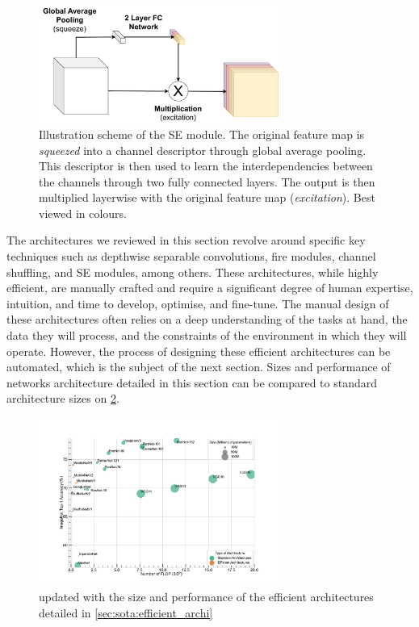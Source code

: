 
\begin{figure}[htbp]
    \centering
    \includegraphics[width=0.70\textwidth]{chapter_sota/assets/SE_module.pdf}
    \caption{Illustration scheme of the \acf{SE} module. The original feature
    map is \emph{squeezed} into a channel descriptor through global average
    pooling. This descriptor is then used to learn the interdependencies between
    the channels through two fully connected layers. The output is then
    multiplied layerwise with the original feature map (\emph{excitation}). Best
    viewed in colours.}
    \label{fig:sota:se_module}
\end{figure}


The architectures we reviewed in this section revolve around specific key
techniques such as depthwise separable convolutions, fire modules, channel
shuffling, and \ac{SE} modules, among others. These architectures, while highly
efficient, are manually crafted and require a significant degree of human
expertise, intuition, and time to develop, optimise, and fine-tune. The manual
design of these architectures often relies on a deep understanding of the tasks
at hand, the data they will process, and the constraints of the environment in
which they will operate. However, the process of designing these efficient
architectures can be automated, which is the subject of the next section. Sizes
and performance of networks architecture detailed in this section can be
compared to standard architecture sizes on \cref{fig:sota:net_sizes_std_eff}.\\

\begin{figure}[htbp]
    \centering
    \includegraphics[width=0.70\textwidth]{chapter_sota/assets/network_sizes_normal_eff.pdf}
    \caption{ updated with the size and performance of the efficient
    architectures detailed in \cref{sec:sota:efficient_archi}}
    \label{fig:sota:net_sizes_std_eff}
\end{figure}




